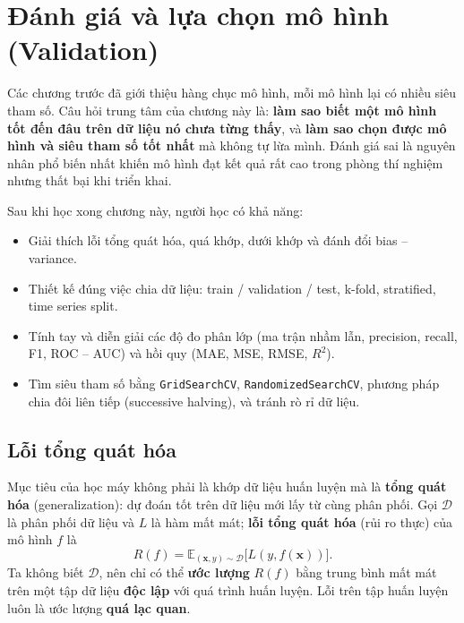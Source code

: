 
\chapter{Đánh giá và lựa chọn mô hình \\ (Validation)}
\label{chap:validation}

Các chương trước đã giới thiệu hàng chục mô hình, mỗi mô hình lại có nhiều siêu tham số. Câu hỏi trung tâm của chương này là: \textbf{làm sao biết một mô hình tốt đến đâu trên dữ liệu nó chưa từng thấy}, và \textbf{làm sao chọn được mô hình và siêu tham số tốt nhất} mà không tự lừa mình. Đánh giá sai là nguyên nhân phổ biến nhất khiến mô hình đạt kết quả rất cao trong phòng thí nghiệm nhưng thất bại khi triển khai.

\noindent Sau khi học xong chương này, người học có khả năng:
\begin{itemize}
    \item Giải thích lỗi tổng quát hóa, quá khớp, dưới khớp và đánh đổi bias -- variance.
    \item Thiết kế đúng việc chia dữ liệu: train / validation / test, k-fold, stratified, time series split.
    \item Tính tay và diễn giải các độ đo phân lớp (ma trận nhầm lẫn, precision, recall, F1, ROC -- AUC) và hồi quy (MAE, MSE, RMSE, $R^2$).
    \item Tìm siêu tham số bằng \texttt{GridSearchCV}, \texttt{RandomizedSearchCV}, phương pháp chia đôi liên tiếp (successive halving), và tránh rò rỉ dữ liệu.
\end{itemize}

\section{Lỗi tổng quát hóa}

Mục tiêu của học máy không phải là khớp dữ liệu huấn luyện mà là \textbf{tổng quát hóa} (generalization): dự đoán tốt trên dữ liệu mới lấy từ cùng phân phối. Gọi $\mathcal{D}$ là phân phối dữ liệu và $L$ là hàm mất mát; \textbf{lỗi tổng quát hóa} (rủi ro thực) của mô hình $f$ là
\begin{equation}
    R(f) = \mathbb{E}_{(\mathbf{x}, y) \sim \mathcal{D}}\big[L(y, f(\mathbf{x}))\big].
\end{equation}
Ta không biết $\mathcal{D}$, nên chỉ có thể \textbf{ước lượng} $R(f)$ bằng trung bình mất mát trên một tập dữ liệu \textbf{độc lập} với quá trình huấn luyện. Lỗi trên tập huấn luyện luôn là ước lượng \textbf{quá lạc quan}.

